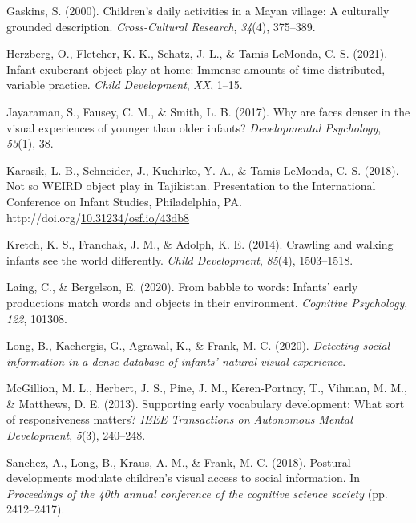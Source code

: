 \documentclass[10pt, letterpaper]{article}
\newenvironment{CSLReferences}%
  {}%
  {\par}
\begin{document}
\begin{CSLReferences}{1}{0}
\leavevmode\hypertarget{ref-gaskins2000childrens}{}%
Gaskins, S. (2000). Children's daily activities in a {M}ayan village: A
culturally grounded description. \emph{Cross-Cultural Research},
\emph{34}(4), 375--389.

\leavevmode\hypertarget{ref-herzberg2021exuberant}{}%
Herzberg, O., Fletcher, K. K., Schatz, J. L., \& Tamis-LeMonda, C. S.
(2021). Infant exuberant object play at home: Immense amounts of
time-distributed, variable practice. \emph{Child Development},
\emph{XX}, 1--15.

\leavevmode\hypertarget{ref-jayaraman2017faces}{}%
Jayaraman, S., Fausey, C. M., \& Smith, L. B. (2017). Why are faces
denser in the visual experiences of younger than older infants?
\emph{Developmental Psychology}, \emph{53}(1), 38.

\leavevmode\hypertarget{ref-karasik2018not}{}%
Karasik, L. B., Schneider, J., Kuchirko, Y. A., \& Tamis-LeMonda, C. S.
(2018). Not so {WEIRD} object play in {T}ajikistan. Presentation to the
International Conference on Infant Studies, Philadelphia, PA.
http://doi.org/\href{https://doi.org/10.31234/osf.io/43db8}{10.31234/osf.io/43db8}

\leavevmode\hypertarget{ref-kretch2014crawling}{}%
Kretch, K. S., Franchak, J. M., \& Adolph, K. E. (2014). Crawling and
walking infants see the world differently. \emph{Child Development},
\emph{85}(4), 1503--1518.

\leavevmode\hypertarget{ref-laing2020babble}{}%
Laing, C., \& Bergelson, E. (2020). From babble to words: Infants' early
productions match words and objects in their environment.
\emph{Cognitive Psychology}, \emph{122}, 101308.

\leavevmode\hypertarget{ref-long2020detecting}{}%
Long, B., Kachergis, G., Agrawal, K., \& Frank, M. C. (2020).
\emph{Detecting social information in a dense database of infants'
natural visual experience}.

\leavevmode\hypertarget{ref-mcgillion2013supporting}{}%
McGillion, M. L., Herbert, J. S., Pine, J. M., Keren-Portnoy, T.,
Vihman, M. M., \& Matthews, D. E. (2013). Supporting early vocabulary
development: What sort of responsiveness matters? \emph{IEEE
Transactions on Autonomous Mental Development}, \emph{5}(3), 240--248.

\leavevmode\hypertarget{ref-sanchez2018detecting}{}%
Sanchez, A., Long, B., Kraus, A. M., \& Frank, M. C. (2018). Postural
developments modulate children's visual access to social information. In
\emph{Proceedings of the 40th annual conference of the cognitive science
society} (pp. 2412--2417).


\end{CSLReferences}
\end{document}
